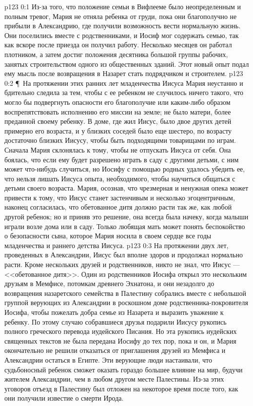 \vs p123 0:1 Из\hyp{}за того, что положение семьи в Вифлееме было неопределенным и полным тревог, Мария не отняла ребенка от груди, пока они благополучно не прибыли в Александрию, где получили возможность вести нормальную жизнь. Они поселились вместе с родственниками, и Иосиф мог содержать семью, так как вскоре после приезда он получил работу. Несколько месяцев он работал плотником, а затем достиг положения десятника большой группы рабочих, занятых строительством одного из общественных зданий. Этот новый опыт подал ему мысль после возвращения в Назарет стать подрядчиком и строителем.
\vs p123 0:2 \P\ На протяжении этих ранних лет младенчества Иисуса Мария неустанно и бдительно следила за тем, чтобы с ее ребенком не случилось ничего такого, что могло бы подвергнуть опасности его благополучие или каким\hyp{}либо образом воспрепятствовать исполнению его миссии на земле; не было матери, более преданной своему ребенку. В доме, где жил Иисус, было двое других детей примерно его возраста, и у близких соседей было еще шестеро, по возрасту достаточно близких Иисусу, чтобы быть подходящими товарищами по играм. Сначала Мария склонялась к тому, чтобы не отпускать Иисуса от себя. Она боялась, что если ему будет разрешено играть в саду с другими детьми, с ним может что\hyp{}нибудь случиться, но Иосифу с помощью родных удалось убедить ее, что нельзя лишать Иисуса опыта, необходимого, чтобы научиться общаться с детьми своего возраста. Мария, осознав, что чрезмерная и ненужная опека может привести к тому, что Иисус станет застенчивым и несколько эгоцентричным, наконец согласилась, что обетованное дитя должно расти так же, как любой другой ребенок; но и приняв это решение, она всегда была начеку, когда малыши играли возле дома или в саду. Только любящая мать может понять беспокойство о безопасности сына, которое Мария носила в своем сердце все годы младенчества и раннего детства Иисуса.
\vs p123 0:3 На протяжении двух лет, проведенных в Александрии, Иисус был вполне здоров и продолжал нормально расти. Кроме нескольких друзей и родственников, никто не знал, что Иисус --- <<обетованное дитя>>. Один из родственников Иосифа открыл это нескольким друзьям в Мемфисе, потомкам древнего Эхнатона, и они незадолго до возвращения назаретского семейства в Палестину собрались вместе с небольшой группой верующих из Александрии в роскошном доме родственника\hyp{}покровителя Иосифа, чтобы пожелать добра семье из Назарета и выразить уважение к ребенку. По этому случаю собравшиеся друзья подарили Иисусу рукопись полного греческого перевода иудейского Писания. Но эта рукопись иудейских священных текстов не была передана Иосифу до тех пор, пока и он, и Мария окончательно не решили отказаться от приглашения друзей из Мемфиса и Александрии остаться в Египте. Эти верующие люди настаивали, что судьбоносный ребенок сможет оказать гораздо большее влияние на мир, будучи жителем Александрии, чем в любом другом месте Палестины. Из\hyp{}за этих уговоров отъезд в Палестину был отложен на некоторое время после того, как они получили известие о смерти Ирода.
